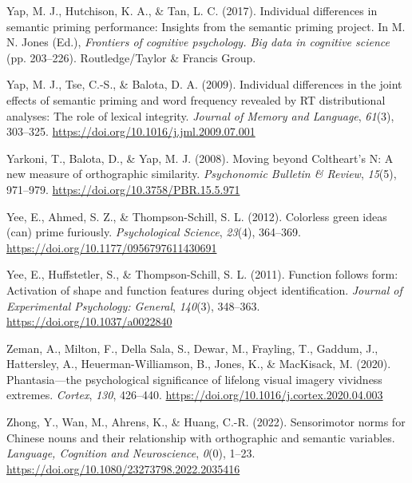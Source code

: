 \documentclass[
  12pt,
  man,floatsintext]{apa7}
\newlength{\cslhangindent}
\newlength{\cslentryspacingunit} %
\newenvironment{CSLReferences}[2] %
 {%
  \setlength{\parindent}{0pt}
  \ifodd #1
  \let\oldpar\par
  \def\par{\hangindent=\cslhangindent\oldpar}
  \fi
  \setlength{\parskip}{#2\cslentryspacingunit}
 }%
 {}
\begin{document}
\begin{CSLReferences}{1}{0}
\leavevmode{}%
Yap, M. J., Hutchison, K. A., \& Tan, L. C. (2017). Individual differences in semantic priming performance: {Insights} from the semantic priming project. In M. N. Jones (Ed.), \emph{Frontiers of cognitive psychology. {Big} data in cognitive science} (pp. 203--226). {Routledge/Taylor \& Francis Group}.

\leavevmode{}%
Yap, M. J., Tse, C.-S., \& Balota, D. A. (2009). Individual differences in the joint effects of semantic priming and word frequency revealed by {RT} distributional analyses: {The} role of lexical integrity. \emph{Journal of Memory and Language}, \emph{61}(3), 303--325. \url{https://doi.org/10.1016/j.jml.2009.07.001}

\leavevmode{}%
Yarkoni, T., Balota, D., \& Yap, M. J. (2008). Moving beyond {Coltheart}'s {N}: {A} new measure of orthographic similarity. \emph{Psychonomic Bulletin \& Review}, \emph{15}(5), 971--979. \url{https://doi.org/10.3758/PBR.15.5.971}

\leavevmode{}%
Yee, E., Ahmed, S. Z., \& Thompson-Schill, S. L. (2012). Colorless green ideas (can) prime furiously. \emph{Psychological Science}, \emph{23}(4), 364--369. \url{https://doi.org/10.1177/0956797611430691}

\leavevmode{}%
Yee, E., Huffstetler, S., \& Thompson-Schill, S. L. (2011). Function follows form: {Activation} of shape and function features during object identification. \emph{Journal of Experimental Psychology: General}, \emph{140}(3), 348--363. \url{https://doi.org/10.1037/a0022840}

\leavevmode{}%
Zeman, A., Milton, F., Della Sala, S., Dewar, M., Frayling, T., Gaddum, J., Hattersley, A., Heuerman-Williamson, B., Jones, K., \& MacKisack, M. (2020). Phantasia---the psychological significance of lifelong visual imagery vividness extremes. \emph{Cortex}, \emph{130}, 426--440. \url{https://doi.org/10.1016/j.cortex.2020.04.003}

\leavevmode{}%
Zhong, Y., Wan, M., Ahrens, K., \& Huang, C.-R. (2022). Sensorimotor norms for {Chinese} nouns and their relationship with orthographic and semantic variables. \emph{Language, Cognition and Neuroscience}, \emph{0}(0), 1--23. \url{https://doi.org/10.1080/23273798.2022.2035416}


\end{CSLReferences}
\end{document}
